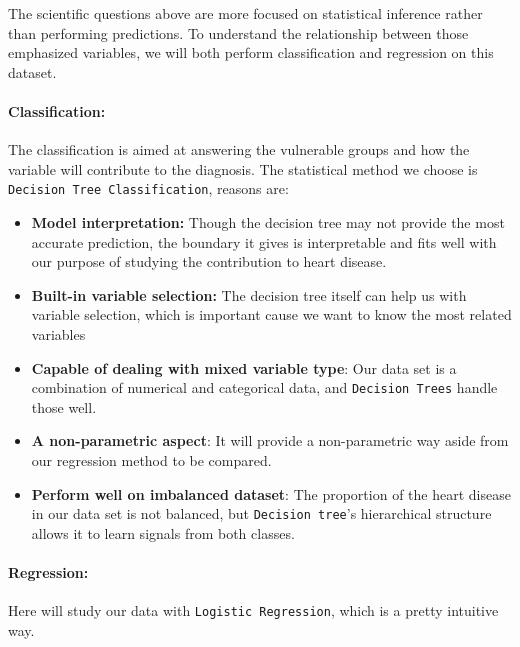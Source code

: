 \documentclass[
  11pt,
]{article}
\providecommand{\tightlist}{%
  \setlength{\itemsep}{0pt}\setlength{\parskip}{0pt}}
\begin{document}
The scientific questions above are more focused on statistical inference
rather than performing predictions. To understand the relationship
between those emphasized variables, we will both perform classification
and regression on this dataset.

\hypertarget{classification}{%
\paragraph{Classification:}\label{classification}}

The classification is aimed at answering the vulnerable groups and how
the variable will contribute to the diagnosis. The statistical method we
choose is \texttt{Decision\ Tree\ Classification}, reasons are:

\begin{itemize}
\tightlist
\item
  \textbf{Model interpretation:} Though the decision tree may not
  provide the most accurate prediction, the boundary it gives is
  interpretable and fits well with our purpose of studying the
  contribution to heart disease.
\item
  \textbf{Built-in variable selection:} The decision tree itself can
  help us with variable selection, which is important cause we want to
  know the most related variables
\item
  \textbf{Capable of dealing with mixed variable type}: Our data set is
  a combination of numerical and categorical data, and
  \texttt{Decision\ Trees} handle those well.
\item
  \textbf{A non-parametric aspect}: It will provide a non-parametric way
  aside from our regression method to be compared.
\item
  \textbf{Perform well on imbalanced dataset}: The proportion of the
  heart disease in our data set is not balanced, but
  \texttt{Decision\ tree}'s hierarchical structure allows it to learn
  signals from both classes.
\end{itemize}

\hypertarget{regression}{%
\paragraph{Regression:}\label{regression}}

Here will study our data with \texttt{Logistic\ Regression}, which is a
pretty intuitive way.
\end{document}

